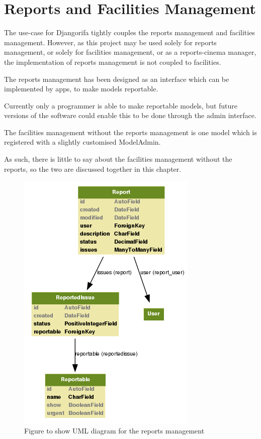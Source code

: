 \chapter{Reports and Facilities Management}
\label{sec:rm}

The use-case for Djangorifa tightly couples the reports management and facilities management. However, as this project may be used solely for reports management, or solely for facilities management, or as a reports-cinema manager, the implementation of reports management is not coupled to facilities.

The reports management has been designed as an interface which can be implemented by apps, to make models reportable.

Currently only a programmer is able to make reportable models, but future versions of the software could enable this to be done through the admin interface.

The facilities management without the reports management is one model which is registered with a slightly customised ModelAdmin.

As such, there is little to say about the facilities management without the reports, so the two are discussed together in this chapter.

\begin{figure}
\centering
\includegraphics[scale=0.51]{img/reports.png}
\caption{Figure to show UML diagram for the reports management}
\label{fig:rm:uml}
\end{figure}

